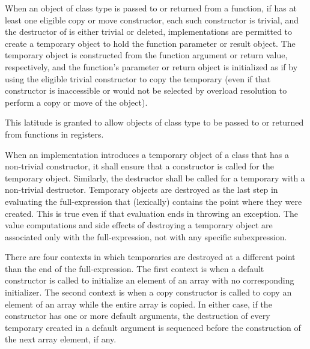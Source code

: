 \pnum
When an object of class type 
is passed to or returned from a function,
if  has at least one eligible copy or move constructor,
each such constructor is trivial,
and the destructor of  is either trivial or deleted,
implementations are permitted
to create a temporary object
to hold the function parameter or result object.
The temporary object is constructed
from the function argument or return value, respectively,
and the function's parameter or return object
is initialized as if by
using the eligible trivial constructor to copy the temporary
(even if that constructor is inaccessible
or would not be selected by overload resolution
to perform a copy or move of the object).
\begin{note}
This latitude is granted to allow objects of class type to be passed to or returned from functions in registers.
\end{note}

\pnum
{}%
%
%
When an implementation introduces a temporary object of a class that has a
non-trivial constructor,
it shall ensure that a constructor is called for the temporary object.
Similarly, the destructor shall be called for a temporary with a non-trivial
destructor.
Temporary objects are destroyed as the last step
in evaluating
the full-expression
that (lexically) contains the point where
they were created.
This is true even if that evaluation ends in throwing an exception.
The
%
value computations and
%
side effects of destroying a temporary object
are associated only with the full-expression, not with any specific
subexpression.

\pnum
{}%
%
There are four contexts in which temporaries are destroyed at a different
point than the end of the full-expression.
The first context is when a default constructor is called to initialize
an element of an array with no corresponding initializer.
The second context is when a copy constructor is called to copy an element of
an array while the entire array is copied.
In either case, if the constructor has one or more default arguments,
the destruction of every temporary created in a default argument is
sequenced before the construction of the next array element, if any.

